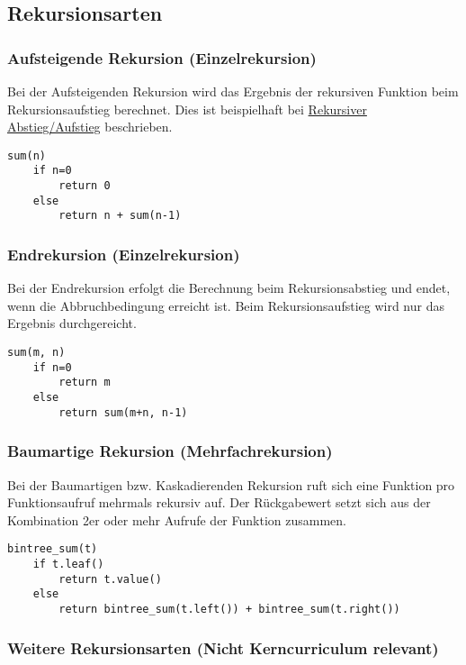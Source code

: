 \subsection{Rekursionsarten}

\subsubsection{Aufsteigende Rekursion (Einzelrekursion)}

Bei der Aufsteigenden Rekursion wird das Ergebnis der rekursiven Funktion
beim Rekursionsaufstieg berechnet. Dies ist beispielhaft bei \hyperref[sec:rekursion_ab_auf]{Rekursiver Abstieg/Aufstieg} beschrieben.

\clearpage

\begin{lstlisting}
sum(n)
    if n=0
        return 0
    else
        return n + sum(n-1)
\end{lstlisting}

\subsubsection{Endrekursion (Einzelrekursion)}

Bei der Endrekursion erfolgt die Berechnung beim Rekursionsabstieg und endet,
wenn die Abbruchbedingung erreicht ist. Beim Rekursionsaufstieg wird nur das
Ergebnis durchgereicht.

\begin{lstlisting}
sum(m, n)
    if n=0
        return m
    else
        return sum(m+n, n-1)
\end{lstlisting}

\subsubsection{Baumartige Rekursion (Mehrfachrekursion)}

Bei der Baumartigen bzw. Kaskadierenden Rekursion ruft sich eine Funktion pro Funktionsaufruf
mehrmals rekursiv auf. Der Rückgabewert setzt sich aus der Kombination 2er oder mehr Aufrufe
der Funktion zusammen.

\begin{lstlisting}
bintree_sum(t)
    if t.leaf()
        return t.value()
    else
        return bintree_sum(t.left()) + bintree_sum(t.right())
\end{lstlisting}

\subsubsection{Weitere Rekursionsarten (Nicht Kerncurriculum relevant)}

